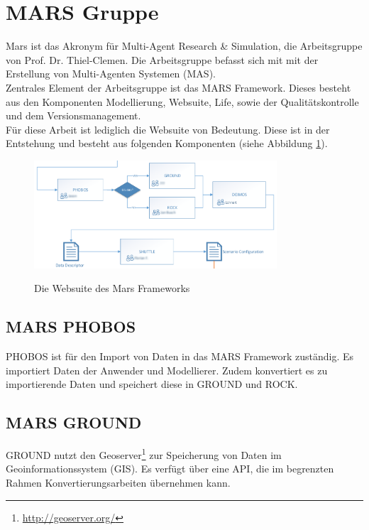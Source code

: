 \documentclass[10pt,conference,compsocconf]{IEEEtran}
\begin{document}
\section{MARS Gruppe}
Mars ist das Akronym für Multi-Agent Research \& Simulation, die Arbeitsgruppe von Prof. Dr. Thiel-Clemen. Die Arbeitsgruppe befasst sich mit mit der Erstellung von Multi-Agenten Systemen (MAS).\\
Zentrales Element der Arbeitsgruppe ist das MARS Framework. Dieses besteht aus den Komponenten Modellierung, Websuite, Life, sowie der Qualitätskontrolle und dem Versionsmanagement.\\
Für diese Arbeit ist lediglich die Websuite von Bedeutung. Diese ist in der Entstehung und besteht aus folgenden Komponenten (siehe Abbildung \ref{img:mars_websuite}).

\begin{figure}[H]
  \centering
  	\includegraphics[height=114pt]{img/mars_websuite}\\
  \caption[]{Die Websuite des Mars Frameworks}
  \label{img:mars_websuite}
\end{figure}

\subsection{MARS PHOBOS}
PHOBOS ist für den Import von Daten in das MARS Framework zuständig. Es importiert Daten der Anwender und Modellierer. Zudem konvertiert es zu importierende Daten und speichert diese in GROUND und ROCK.

\subsection{MARS GROUND}
GROUND nutzt den Geoserver\footnote{\url{http://geoserver.org/}} zur Speicherung von Daten im Geoinformationssystem (GIS). Es verfügt über eine API, die im begrenzten Rahmen Konvertierungsarbeiten übernehmen kann.
\end{document}
